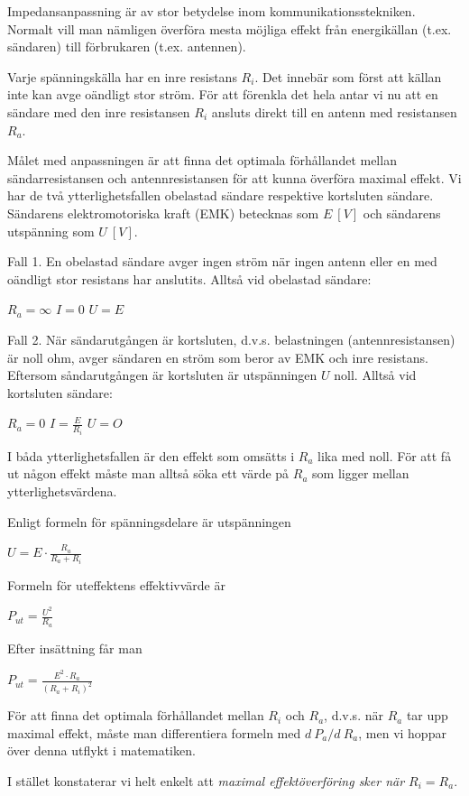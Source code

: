 Impedansanpassning är av stor betydelse inom kommunikationsstekniken.
Normalt vill man nämligen överföra mesta möjliga effekt från energikällan
(t.ex. sändaren) till förbrukaren (t.ex. antennen).

Varje spänningskälla har en inre resistans \(R_i\). Det innebär som först att
källan inte kan avge oändligt stor ström. För att förenkla det hela antar vi nu
att en sändare med den inre resistansen \(R_i\) ansluts direkt till en antenn
med resistansen \(R_a\).

Målet med anpassningen är att finna det optimala förhållandet mellan
sändarresistansen och antennresistansen för att kunna överföra maximal effekt.
Vi har de två ytterlighetsfallen obelastad sändare respektive kortsluten
sändare. Sändarens elektromotoriska kraft (EMK) betecknas som \(E\ [V]\) och
sändarens utspänning som \(U\ [V]\).

Fall 1.
En obelastad sändare avger ingen ström när ingen antenn eller en med oändligt
stor resistans har anslutits.
Alltså vid obelastad sändare:

\(R_a = \infty\) \(I = 0\) \(U = E\)

Fall 2.
När sändarutgången är kortsluten, d.v.s. belastningen (antennresistansen) är
noll ohm, avger sändaren en ström som beror av EMK och inre resistans. Eftersom
såndarutgången är kortsluten är utspänningen \(U\) noll.
Alltså vid kortsluten sändare:

\(R_a = 0\) \(I = \frac{E}{R_i}\) \(U = O\)

I båda ytterlighetsfallen är den effekt som omsätts i \(R_a\) lika med noll.
För att få ut någon effekt måste man alltså söka ett värde på \(R_a\) som
ligger mellan ytterlighetsvärdena.

Enligt formeln för spänningsdelare är utspänningen

\(U = E \cdot \frac{R_a}{R_a+R_i}\)

Formeln för uteffektens effektivvärde är

\(P_{ut} = \frac{U^2}{R_a}\)

Efter insättning får man

\(P_{ut} = \frac{E^2 \cdot R_a}{(R_a + R_i)^2}\)

För att finna det optimala förhållandet mellan \(R_i\) och \(R_a\), d.v.s. när
\(R_a\) tar upp maximal effekt, måste man differentiera formeln med \(d\ P_a/d\ R_a\), men vi hoppar över denna utflykt i matematiken.

I stället konstaterar vi helt enkelt att \emph{maximal effektöverföring sker när
\(R_i = R_a\)}.

